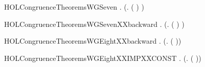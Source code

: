 \newcommand{\HOLCongruenceTheoremsWGSixXXbackward}{\UseVerbatim{HOLCongruenceTheoremsWGSixXXbackward}}
\begin{SaveVerbatim}{HOLCongruenceTheoremsWGSeven}
\HOLTokenTurnstile{} \HOLSymConst{\HOLTokenForall{}} .   \HOLSymConst{\HOLTokenImp{}}  (\HOLTokenLambda{}.  ( ) )
\end{SaveVerbatim}
\newcommand{\HOLCongruenceTheoremsWGSeven}{\UseVerbatim{HOLCongruenceTheoremsWGSeven}}
\begin{SaveVerbatim}{HOLCongruenceTheoremsWGSevenXXbackward}
\HOLTokenTurnstile{} \HOLSymConst{\HOLTokenForall{}} .  (\HOLTokenLambda{}.  ( ) ) \HOLSymConst{\HOLTokenImp{}}  
\end{SaveVerbatim}
\newcommand{\HOLCongruenceTheoremsWGSevenXXbackward}{\UseVerbatim{HOLCongruenceTheoremsWGSevenXXbackward}}
\begin{SaveVerbatim}{HOLCongruenceTheoremsWGEightXXbackward}
\HOLTokenTurnstile{} \HOLSymConst{\HOLTokenForall{}} .  (\HOLTokenLambda{}.   ( )) \HOLSymConst{\HOLTokenImp{}}  
\end{SaveVerbatim}
\newcommand{\HOLCongruenceTheoremsWGEightXXbackward}{\UseVerbatim{HOLCongruenceTheoremsWGEightXXbackward}}
\begin{SaveVerbatim}{HOLCongruenceTheoremsWGEightXXIMPXXCONST}
\HOLTokenTurnstile{} \HOLSymConst{\HOLTokenForall{}} .  (\HOLTokenLambda{}.   ( )) \HOLSymConst{\HOLTokenImp{}}  
\end{SaveVerbatim}
\newcommand{\HOLCongruenceTheoremsWGEightXXIMPXXCONST}{\UseVerbatim{HOLCongruenceTheoremsWGEightXXIMPXXCONST}}
